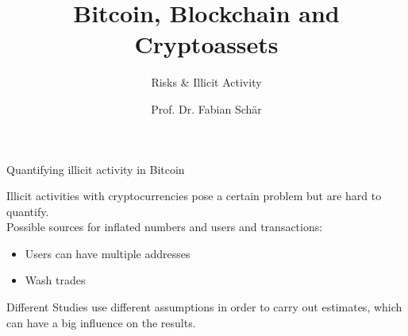 \documentclass[]{beamer}
\title{Bitcoin, Blockchain and Cryptoassets}
\subtitle{Risks \& Illicit Activity}
\author{Prof. Dr. Fabian Schär}
\institute{University of Basel}
\begin{document}
\thispagestyle{empty}
\begin{frame}[noframenumbering]
	\titlepage
\end{frame}

\begin{frame}{Quantifying illicit activity in Bitcoin}

Illicit activities with cryptocurrencies pose a certain problem but are hard to quantify. \\
	\vspace{1em}
	Possible sources for inflated numbers and users and transactions:
		\begin{itemize}
			\item Users can have multiple addresses
			\item Wash trades
		\end{itemize}
	\vspace{1em} 
	
	Different Studies use different assumptions in order to carry out estimates, which can have a big influence on the results.	
\end{frame}
\end{document}
